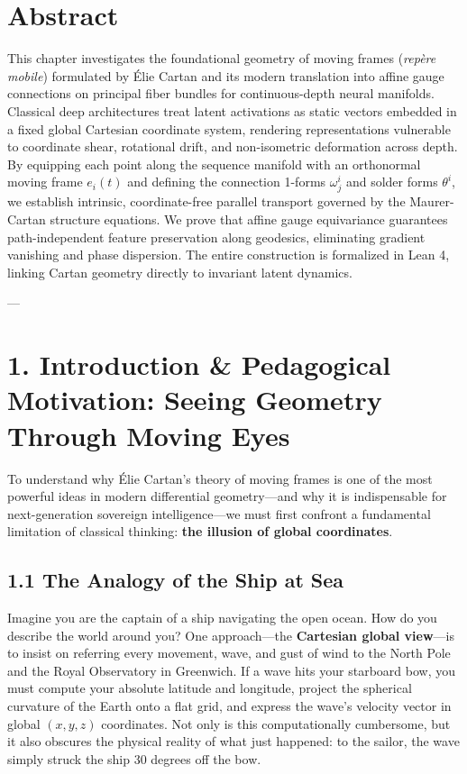 \documentclass[11pt,twoside,openright]{amsbook}
\begin{document}
{{{{{{\section{Abstract}
This chapter investigates the foundational geometry of moving frames (\textit{repère mobile}) formulated by Élie Cartan and its modern translation into affine gauge connections on principal fiber bundles for continuous-depth neural manifolds. Classical deep architectures treat latent activations as static vectors embedded in a fixed global Cartesian coordinate system, rendering representations vulnerable to coordinate shear, rotational drift, and non-isometric deformation across depth. By equipping each point along the sequence manifold with an orthonormal moving frame $e_i(t)$ and defining the connection 1-forms $\omega^i_j$ and solder forms $\theta^i$, we establish intrinsic, coordinate-free parallel transport governed by the Maurer-Cartan structure equations. We prove that affine gauge equivariance guarantees path-independent feature preservation along geodesics, eliminating gradient vanishing and phase dispersion. The entire construction is formalized in Lean 4, linking Cartan geometry directly to invariant latent dynamics.

---

\section{1. Introduction & Pedagogical Motivation: Seeing Geometry Through Moving Eyes}

To understand why Élie Cartan’s theory of moving frames is one of the most powerful ideas in modern differential geometry—and why it is indispensable for next-generation sovereign intelligence—we must first confront a fundamental limitation of classical thinking: \textbf{the illusion of global coordinates}.

\subsection{1.1 The Analogy of the Ship at Sea}
Imagine you are the captain of a ship navigating the open ocean. How do you describe the world around you?
One approach—the \textbf{Cartesian global view}—is to insist on referring every movement, wave, and gust of wind to the North Pole and the Royal Observatory in Greenwich. If a wave hits your starboard bow, you must compute your absolute latitude and longitude, project the spherical curvature of the Earth onto a flat grid, and express the wave’s velocity vector in global $(x, y, z)$ coordinates. Not only is this computationally cumbersome, but it also obscures the physical reality of what just happened: to the sailor, the wave simply struck the ship 30 degrees off the bow.

}}}}}}
\end{document}
